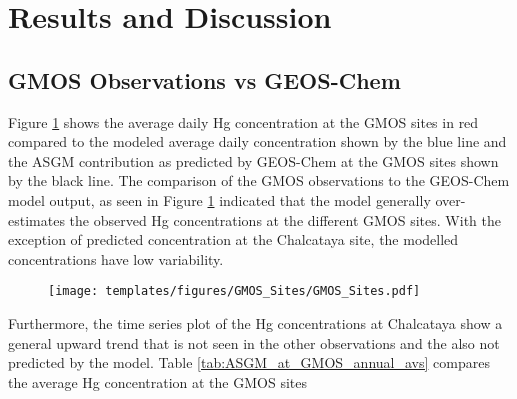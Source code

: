 \section{Results and Discussion}
\subsection{GMOS Observations vs GEOS-Chem}
\begin{flushleft}
Figure \ref{fig:GMOSvsGC} shows the average daily Hg concentration at the GMOS sites in red compared to the modeled average daily concentration shown by the blue line and the ASGM contribution as predicted by GEOS-Chem at the GMOS sites shown by the black line. The comparison of the GMOS observations to the GEOS-Chem model output, as seen in Figure \ref{fig:GMOSvsGC} indicated that the model generally over-estimates the observed Hg concentrations at the different GMOS sites.  With the exception of predicted concentration at the Chalcataya site, the modelled concentrations have low variability.  
\end{flushleft}


\begin{figure}[H]
\texttt{[image: templates/figures/GMOS\_Sites/GMOS\_Sites.pdf]}
\centering
{}
\label{fig:GMOSvsGC}
\end{figure}
\FloatBarrier

\begin{flushleft}
 Furthermore, the time series plot of the Hg concentrations at Chalcataya show a general upward trend that is not seen in the other observations and the also not predicted by the model. Table \ref{tab:ASGM_at_GMOS_annual_avs} compares the average  Hg concentration at the GMOS sites 
\end{flushleft}


